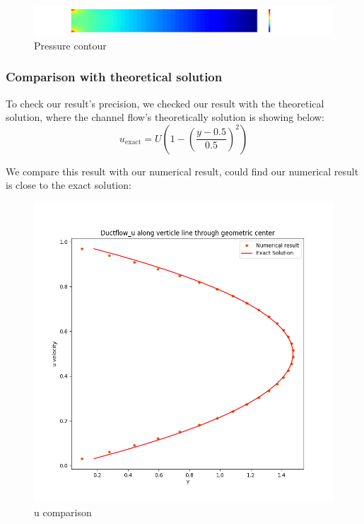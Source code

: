 \documentclass[12pt]{article}
\begin{document}
\begin{figure}[H]
    \centering
    \includegraphics[width=1.2\linewidth]{figure/Channel_flow/ductflow_p_contour_N=32.jpg}
    \caption{Pressure contour}
\end{figure}



\subsubsection{Comparison with theoretical solution}

To check our result's precision, we checked our result with the theoretical solution, where the channel flow's theoretically solution is showing below:
$$
u_{\text{exact}} = U \left(1 - \left(\frac{y - 0.5}{0.5}\right)^2\right)
$$

We compare this result with our numerical result, could find our numerical result is close to the exact solution:

\begin{figure}[H]
    \centering
    \includegraphics[width=0.6\linewidth]{figure/Channel_flow/Ductflow_u along verticle line through geometric center.jpg}
    \caption{u comparison}
\end{figure}
\end{document}
